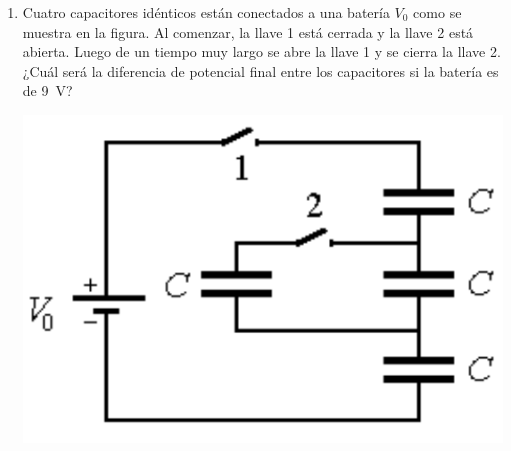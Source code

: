 \documentclass[11pt,spanish,a4paper]{article}
\begin{document}
\begin{enumerate}
	\item \begin{minipage}[t]{0.7\textwidth}
		Cuatro capacitores idénticos están conectados a una batería \(V_0\) como se muestra en la figura.
		Al comenzar, la llave 1 está cerrada y la llave 2 está abierta.
		Luego de un tiempo muy largo se abre la llave 1 y se cierra la llave 2.
		¿Cuál será la diferencia de potencial final entre los capacitores si la batería es de \SI{9}{\volt}?
    \end{minipage}
    \begin{minipage}[c][1em][t]{0.25\textwidth}
            \includegraphics[width=\textwidth]{p2e07}
    \end{minipage}



\end{enumerate}
\end{document}
